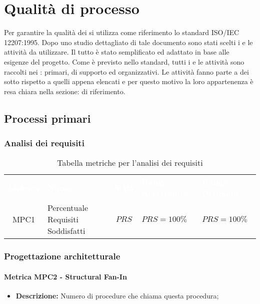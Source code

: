 \section{Qualità di processo}
Per garantire la qualità dei  si utilizza come riferimento lo standard ISO/IEC 12207:1995. Dopo uno studio dettagliato di tale documento sono stati scelti i 
e le attività da utilizzare. Il tutto è stato semplificato ed adattato in base alle esigenze del progetto. Come è previsto nello standard, tutti i  e le attività sono raccolti 
nei : primari, di supporto ed organizzativi. Le attività fanno parte a dei sotto  rispetto a quelli appena elencati e per questo motivo la loro 
appartenenza è resa chiara nella sezione:  di riferimento.

\subsection{Processi primari}

\subsubsection{Analisi dei requisiti}
   \renewcommand{\arraystretch}{1.5}
   \begin{longtable}{ c C{4cm} c C{3.5cm} C{3.5cm}}
   	\caption{Tabella metriche per l'analisi dei requisiti}\\
   	\textcolor{white}{\textbf{Metrica}} & \textcolor{white}{\textbf{Nome}} & \textcolor{white}{\textbf{Sigla}} & \textcolor{white}{\textbf{Range Accettabile}} & \textcolor{white}{\textbf{Range Ottimale}}\\
   	MPC1 & Percentuale Requisiti Soddisfatti & $PRS$ & $PRS = 100\%$ & $PRS = 100\%$ \\
   \end{longtable}
\vspace{0.3cm}
\subsubsection{Progettazione architetturale}

\paragraph{Metrica MPC2 - Structural Fan-In}
\begin{itemize}
	\item \textbf{Descrizione:} Numero di procedure che chiama questa procedura;
\end{itemize}
